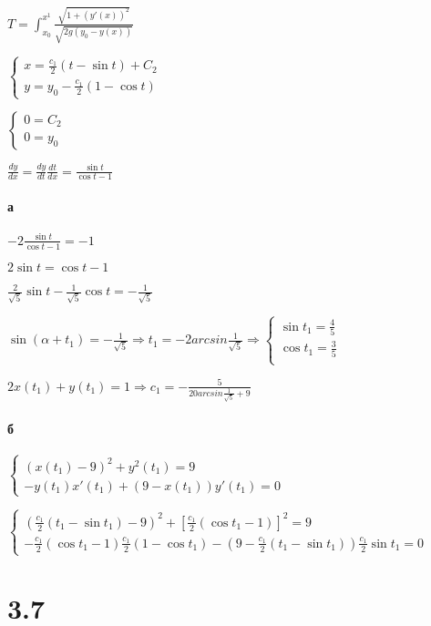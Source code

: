 \documentclass[russian]{article}
\begin{document}
$T=\int_{x_0}^{x^1}\frac{\sqrt{1+(y'(x))^2}}{\sqrt{2g(y_0-y(x))}}$

$\begin{cases}
x=\frac{c_1}{2}(t-\sin t) + C_2 \\
y = y_0 - \frac{c_1}{2}(1 - \cos t)
\end{cases}$

$\begin{cases}
0 = C_2 \\
0 = y_0
\end{cases}$

$\frac{dy}{dx} = \frac{dy}{dt}\frac{dt}{dx} = \frac{\sin t}{\cos t - 1}$

\paragraph*{а}

$-2 \frac{\sin t}{\cos t - 1} = -1$

$2 \sin t = \cos t - 1$

$\frac{2}{\sqrt{5}} \sin t - \frac{1}{\sqrt{5}}\cos t = - \frac{1}{\sqrt{5}}$

$\sin (\alpha + t_1)=-\frac{1}{\sqrt{5}} \Rightarrow t_1 = -2 arcsin \frac{1}{\sqrt{5}}
\Rightarrow 
\begin{cases}
\sin t_1 = \frac{4}{5} \\
\cos t_1 = \frac{3}{5} \\
\end{cases}$

$ 2x(t_1)+y(t_1) = 1 \Rightarrow 	c_1 = -\frac{5}{20 arcsin \frac{1}{\sqrt{5}} + 9}$

\paragraph*{б}

$\begin{cases}
(x(t_1) - 9)^2 + y^2(t_1)=9 \\
-y(t_1) x'(t_1) + (9 - x(t_1))y'(t_1) = 0
\end{cases}$

$\begin{cases}
(\frac{c_1}{2}(t_1-\sin t_1) - 9)^2 + [\frac{c_1}{2}(\cos t_1 - 1)]^2=9 \\
-\frac{c_1}{2}(\cos t_1 - 1) \frac{c_1}{2}(1-\cos t_1) - (9 - \frac{c_1}{2}(t_1-\sin t_1))\frac{c_1}{2}\sin t_1 = 0
\end{cases}$

\section*{3.7}
\end{document}
